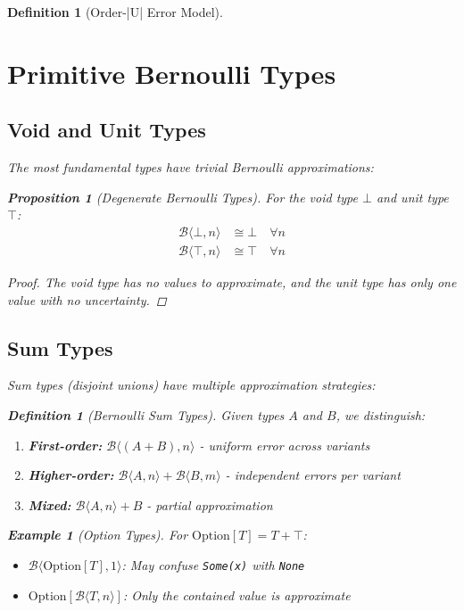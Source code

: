 \documentclass[11pt,final,hidelinks]{article}
\newtheorem{proposition}[theorem]{Proposition}
\newtheorem{definition}[theorem]{Definition}
\newtheorem{example}[theorem]{Example}
\newcommand{\bernoulli}[2]{\mathcal{B}\langle #1, #2 \rangle}
\begin{document}
\begin{definition}[Order-|U| Error Model]
\section{Primitive Bernoulli Types}

\subsection{Void and Unit Types}

The most fundamental types have trivial Bernoulli approximations:

\begin{proposition}[Degenerate Bernoulli Types]
For the void type $\bot$ and unit type $\top$:
\begin{align}
\bernoulli{\bot}{n} &\cong \bot \quad \forall n \\
\bernoulli{\top}{n} &\cong \top \quad \forall n
\end{align}
\end{proposition}

\begin{proof}
The void type has no values to approximate, and the unit type has only one value with no uncertainty.
\end{proof}

\subsection{Sum Types}

Sum types (disjoint unions) have multiple approximation strategies:

\begin{definition}[Bernoulli Sum Types]
Given types $A$ and $B$, we distinguish:
\begin{enumerate}
    \item \textbf{First-order:} $\bernoulli{(A + B)}{n}$ - uniform error across variants
    \item \textbf{Higher-order:} $\bernoulli{A}{n} + \bernoulli{B}{m}$ - independent errors per variant
    \item \textbf{Mixed:} $\bernoulli{A}{n} + B$ - partial approximation
\end{enumerate}
\end{definition}

\begin{example}[Option Types]
For $\text{Option}[T] = T + \top$:
\begin{itemize}
    \item $\bernoulli{\text{Option}[T]}{1}$: May confuse \texttt{Some(x)} with \texttt{None}
    \item $\text{Option}[\bernoulli{T}{n}]$: Only the contained value is approximate
\end{itemize}
\end{example}


\end{definition}
\end{document}
